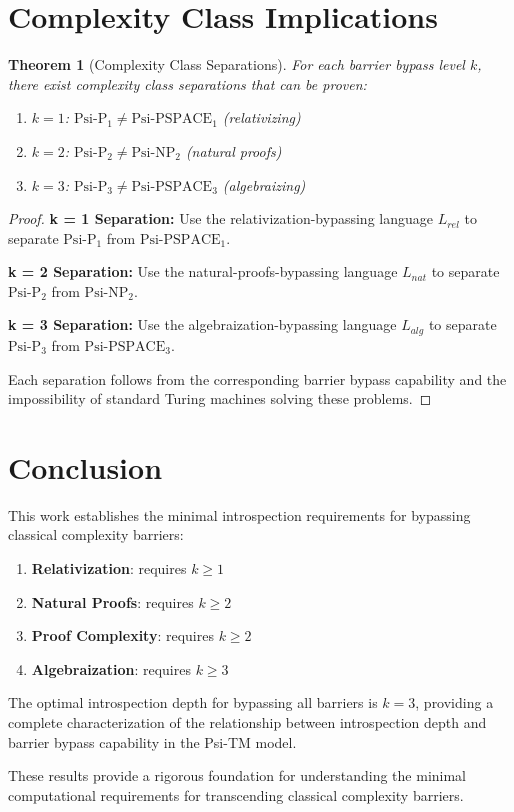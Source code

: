 \documentclass[11pt]{article}
\newtheorem{theorem}{Theorem}
\begin{document}
\section{Complexity Class Implications}

\begin{theorem}[Complexity Class Separations]
For each barrier bypass level $k$, there exist complexity class separations that can be proven:
\begin{enumerate}
\item $k = 1$: $\text{Psi-P}_1 \neq \text{Psi-PSPACE}_1$ (relativizing)
\item $k = 2$: $\text{Psi-P}_2 \neq \text{Psi-NP}_2$ (natural proofs)
\item $k = 3$: $\text{Psi-P}_3 \neq \text{Psi-PSPACE}_3$ (algebraizing)
\end{enumerate}
\end{theorem}

\begin{proof}
\textbf{k = 1 Separation:}
Use the relativization-bypassing language $L_{rel}$ to separate $\text{Psi-P}_1$ from $\text{Psi-PSPACE}_1$.

\textbf{k = 2 Separation:}
Use the natural-proofs-bypassing language $L_{nat}$ to separate $\text{Psi-P}_2$ from $\text{Psi-NP}_2$.

\textbf{k = 3 Separation:}
Use the algebraization-bypassing language $L_{alg}$ to separate $\text{Psi-P}_3$ from $\text{Psi-PSPACE}_3$.

Each separation follows from the corresponding barrier bypass capability and the impossibility of standard Turing machines solving these problems.
\end{proof}

\section{Conclusion}

This work establishes the minimal introspection requirements for bypassing classical complexity barriers:

\begin{enumerate}
\item \textbf{Relativization}: requires $k \geq 1$
\item \textbf{Natural Proofs}: requires $k \geq 2$
\item \textbf{Proof Complexity}: requires $k \geq 2$
\item \textbf{Algebraization}: requires $k \geq 3$
\end{enumerate}

The optimal introspection depth for bypassing all barriers is $k = 3$, providing a complete characterization of the relationship between introspection depth and barrier bypass capability in the Psi-TM model.

These results provide a rigorous foundation for understanding the minimal computational requirements for transcending classical complexity barriers.
\end{document}
